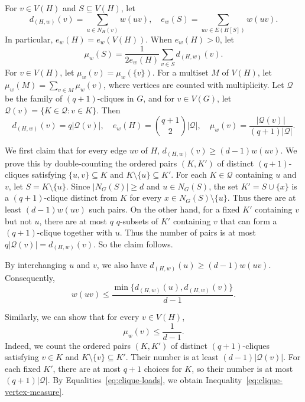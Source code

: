 \documentclass[12pt]{article}
\numberwithin{equation}{section}
\theoremstyle{definition}
\begin{document}
For $v\in V(H)$ and $S\subseteq V(H)$, let
\[
 d_{(H,w)}(v)=\sum_{u\in N_H(v)}w(uv),
 \quad
 e_w(S)=\sum_{uv\in E(H[S])}w(uv).
\]
In particular, $e_w(H)=e_w(V(H))$. When $e_w(H)>0$, let
\[
 \mu_w(S)=\frac{1}{2e_w(H)}\sum_{v\in S}d_{(H,w)}(v).
\]
For $v\in V(H)$, let $\mu_w(v)=\mu_w(\{v\})$. For a multiset $M$ of
$V(H)$, let $\mu_w(M)=\sum_{v\in M}\mu_w(v)$, where vertices are counted with
multiplicity. Let $\mathcal Q$ be the family of $(q+1)$-cliques in $G$, and
for $v\in V(G)$, let $\mathcal Q(v)=\{K\in\mathcal Q:v\in K\}$. Then
\begin{equation}\label{eq:clique-loads}
 d_{(H,w)}(v)=q|\mathcal Q(v)|,
 \quad
 e_w(H)=\binom{q+1}{2}|\mathcal Q|,
 \quad
 \mu_w(v)=\frac{|\mathcal Q(v)|}{(q+1)|\mathcal Q|}.
\end{equation}

We first claim that for every edge $uv$ of $H$, $d_{(H,w)}(v) \geq (d-1)w(uv)$. We prove this by double-counting the ordered pairs $(K,K')$ of distinct $(q+1)$-cliques
satisfying $\{u,v\}\subseteq K$ and $K \setminus\{u\}\subseteq K'$. For each
$K \in \mathcal{Q}$ containing $u$ and $v$, let $S = K\setminus\{u\}$. Since
$|N_G(S)|\geq d$ and $u\in N_G(S)$, the set
$K'= S\cup\{x\}$ is a $(q+1)$-clique distinct from $K$ for every
$x\in N_G(S)\setminus\{u\}$. Thus there are at least
$(d-1)w(uv)$ such pairs. 
On the other hand, for a fixed $K'$ containing $v$ but not $u$, there are at
most $q$ $q$-subsets of $K'$ containing $v$ that can form a $(q+1)$-clique
together with $u$. Thus the number of pairs is at most
$q|\mathcal Q(v)|=d_{(H,w)}(v)$. So the claim follows.
 
By interchanging $u$ and $v$, we also have
$d_{(H,w)}(u)\geq(d-1)w(uv)$. Consequently,
\begin{equation}\label{eq:clique-edge-weight}
 w(uv)\leq
 \frac{\min\{d_{(H,w)}(u),d_{(H,w)}(v)\}}{d-1}.
\end{equation}

Similarly, we can show that for every $v\in V(H)$,
\begin{equation}\label{eq:clique-vertex-measure}
 \mu_w(v)\leq\frac{1}{d-1}.
\end{equation}
Indeed, we count the ordered pairs $(K,K')$ of distinct $(q+1)$-cliques
satisfying $v\in K$ and $K\setminus\{v\}\subseteq K'$. Their number is at
least $(d-1)|\mathcal Q(v)|$. For each fixed $K'$, there are at most $q+1$
choices for $K$, so their number is at most $(q+1)|\mathcal Q|$. By
Equalities~\eqref{eq:clique-loads}, we obtain
Inequality~\eqref{eq:clique-vertex-measure}.
\end{document}
